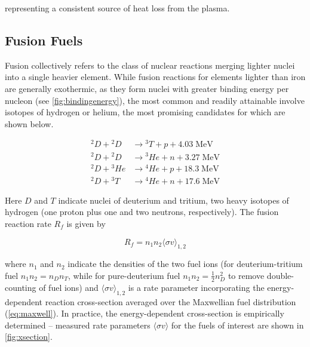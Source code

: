 \noindent representing a consistent source of heat loss from the plasma.

\subsection{Fusion Fuels}\label{subsec:intro_fuels}

Fusion collectively refers to the class of nuclear reactions merging lighter nuclei into a single heavier element.  While fusion reactions for elements lighter than iron are generally exothermic, as they form nuclei with greater binding energy per nucleon (see \cref{fig:bindingenergy}), the most common and readily attainable involve isotopes of hydrogen or helium, the most promising candidates for which are shown below.

\begin{align}
 {}^2\si{D} + {}^2\si{D} &\rightarrow {}^3\si{T} + \si{p} + 4.03 \;\si{\mega\electronvolt}\label{eq:dd1}\\
 {}^2\si{D} + {}^2\si{D} &\rightarrow {}^{3}\si{He} + \si{n} + 3.27 \;\si{\mega\electronvolt}\label{eq:dd2}\\
 {}^2\si{D} + {}^3\si{He} &\rightarrow {}^4\si{He} + \si{p} + 18.3 \;\si{\mega\electronvolt}\label{eq:dhe3}\\
  {}^2\si{D} + {}^3\si{T} &\rightarrow {}^4\si{He} + \si{n} + 17.6 \;\si{\mega\electronvolt}\label{eq:dt}
\end{align}

\noindent Here $\si{D}$ and $\si{T}$ indicate nuclei of deuterium and tritium, two heavy isotopes of hydrogen (one proton plus one and two neutrons, respectively).  The fusion reaction rate $R_f$ is given by

\begin{equation}\label{eq:rate}
 R_f = n_1 n_2 \langle \sigma v \rangle_{1,2}
\end{equation}

\noindent where $n_1$ and $n_2$ indicate the densities of the two fuel ions (\eg for deuterium-tritium fuel $n_1 n_2 = n_D n_T$, while for pure-deuterium fuel $n_1 n_2 = \frac{1}{2} n_D^2$ to remove double-counting of fuel ions) and $\langle \sigma v \rangle_{1,2}$ is a rate parameter incorporating the energy-dependent reaction cross-section averaged over the Maxwellian fuel distribution (\cref{eq:maxwell}).  In practice, the energy-dependent cross-section is empirically determined -- measured rate parameters $\langle \sigma v \rangle$ for the fuels of interest are shown in \cref{fig:xsection}.

